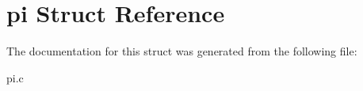 \hypertarget{structpi}{}\section{pi Struct Reference}
\label{structpi}


The documentation for this struct was generated from the following file\+:\begin{DoxyCompactItemize}
\item 
pi.\+c\end{DoxyCompactItemize}
